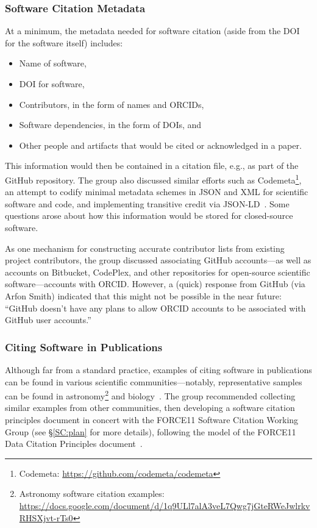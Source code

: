 \subsubsection{Software Citation Metadata}

At a minimum, the metadata needed for software citation (aside from the DOI for the software itself) includes:
\begin{itemize}
    \item Name of software,
    \item DOI for software,
    \item Contributors, in the form of names and ORCIDs,
    \item Software dependencies, in the form of DOIs, and
    \item Other people and artifacts that would be cited or acknowledged in a paper.
\end{itemize}
This information would then be contained in a citation file, e.g.,  as part of 
the GitHub repository.
The group also discussed similar efforts such as Codemeta\footnote{Codemeta: \url{https://github.com/codemeta/codemeta}}, an attempt to codify minimal 
metadata schemes in JSON and XML for scientific software and code, and 
implementing transitive credit via JSON-LD~\cite{wssspe2_katz}.
Some questions arose about how this information would be stored for 
closed-source software.

As one mechanism for constructing accurate contributor lists from existing 
project contributors, the group discussed associating GitHub accounts---as 
well as accounts on Bitbucket, CodePlex, and other repositories for 
open-source scientific software---accounts with ORCID.
However, a (quick) response from GitHub (via Arfon Smith) indicated that 
this might not be possible in the near future: ``GitHub doesn't have any 
plans to allow ORCID accounts to be associated with GitHub user accounts.''

\subsubsection{Citing Software in Publications}

Although far from a standard practice, examples of citing software in 
publications can be found in various scientific communities---notably, 
representative samples can be found in astronomy\footnote{Astronomy software citation examples: \url{https://docs.google.com/document/d/1q9ULl7alA3veL7Qwg7jGteRWeJwlrkvRHSXjvt-rTs0}} and biology~\cite{Howison2015}.
The group recommended collecting similar examples from other communities, then 
developing a software citation principles document in concert with the 
FORCE11 Software Citation Working Group (see \S\ref{SC:plan} for more details), 
following the model of the FORCE11 Data Citation Principles 
document~\cite{DataCitation2014}.

